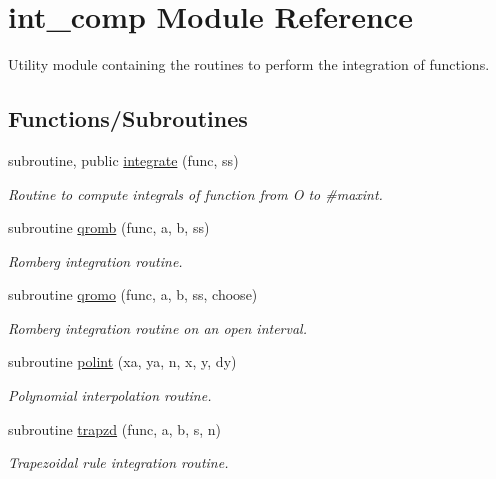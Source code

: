 \hypertarget{namespaceint__comp}{}\section{int\+\_\+comp Module Reference}
\label{namespaceint__comp}


Utility module containing the routines to perform the integration of functions.  


\subsection*{Functions/\+Subroutines}
\begin{DoxyCompactItemize}
\item 
subroutine, public \hyperlink{namespaceint__comp_abe29ceac2104e45aafacb9cfaed81678}{integrate} (func, ss)
\begin{DoxyCompactList}\small\item\em Routine to compute integrals of function from O to \#maxint. \end{DoxyCompactList}\item 
subroutine \hyperlink{namespaceint__comp_ac2e03ae287d3d4d6f2200ec47811934f}{qromb} (func, a, b, ss)
\begin{DoxyCompactList}\small\item\em Romberg integration routine. \end{DoxyCompactList}\item 
subroutine \hyperlink{namespaceint__comp_a168d531430c3bc8b148e2fed9e737cb7}{qromo} (func, a, b, ss, choose)
\begin{DoxyCompactList}\small\item\em Romberg integration routine on an open interval. \end{DoxyCompactList}\item 
subroutine \hyperlink{namespaceint__comp_a0124c395371f5bfddb47dd0bd6cd7546}{polint} (xa, ya, n, x, y, dy)
\begin{DoxyCompactList}\small\item\em Polynomial interpolation routine. \end{DoxyCompactList}\item 
subroutine \hyperlink{namespaceint__comp_a28bf085971c103555a3af11940180299}{trapzd} (func, a, b, s, n)
\begin{DoxyCompactList}\small\item\em Trapezoidal rule integration routine. \end{DoxyCompactList}\item 

\end{DoxyCompactItemize}
